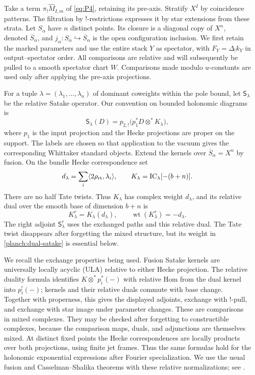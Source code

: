 \documentclass[11pt]{article}
\numberwithin{equation}{section}
\theoremstyle{definition}
\theoremstyle{remark}
\begin{document}
Take a term $\pi_!\widehat M_{I,m}$ of \eqref{eq:P4}, retaining its
pre-axis.  Stratify $X^I$ by coincidence patterns.  The filtration by
$!$-restrictions expresses it by star extensions from these strata.
Let $S_\alpha$ have $n$ distinct points.  Its closure is a diagonal copy
of $X^n$, denoted $\overline S_\alpha$, and
$j_\alpha:S_\alpha\hookrightarrow\overline S_\alpha$ is the open
configuration inclusion.  We first retain the marked parameters and
use the entire stack $Y$ as spectator, with
$F_Y=\Delta_!k_Y$ in output--spectator order.  All comparisons are
relative and will subsequently
be pulled to a smooth spectator chart $W$.  Comparisons made modulo
$u$-constants are used only after applying the pre-axis projections.

For a tuple $\lambda=(\lambda_1,\ldots,\lambda_n)$ of dominant
coweights within the pole bound, let $\mathsf S_\lambda$ be the relative
Satake operator.  Our convention on bounded holonomic diagrams is
\[
 \mathsf S_\lambda(D)
   =p_{2,!}\bigl(p_1^*D\otimes^* K_\lambda\bigr),
\]
where $p_1$ is the input projection and the Hecke projections are proper
on the support.  The labels are chosen so that application to the
vacuum gives the corresponding Whittaker standard objects.  Extend
the kernels over $\overline S_\alpha=X^n$ by fusion.  On the bundle
Hecke correspondence set
\[
 d_\lambda=\sum_i\langle2\rho_{\rm rt},\lambda_i\rangle,
 \qquad
 K_\lambda=\operatorname{IC}_\lambda[-(b+n)].
\]
There are no half Tate twists.  Thus $K_\lambda$ has complex weight
$d_\lambda$, and its relative dual over the smooth base of dimension
$b+n$ is
\begin{equation}
 K_\lambda^r=K_\lambda(d_\lambda),\qquad
 \operatorname{wt}(K_\lambda^r)=-d_\lambda.
 \label{planch:dual-satake}
\end{equation}
The right adjoint $\mathsf S_\lambda^r$ uses the exchanged paths and
this relative dual.  The Tate twist disappears after forgetting the
mixed structure, but its weight in \eqref{planch:dual-satake} is
essential below.

We recall the exchange properties being used.  Fusion Satake kernels
are universally locally acyclic (ULA) relative to either Hecke
projection.  The relative duality formula identifies
$K\otimes^*p_i^*(-)$ with relative Hom from the dual kernel into
$p_i^!(-)$; kernels and their relative duals commute with base change.
Together with properness, this gives the displayed adjoints, exchange
with $!$-pull, and exchange with star image under parameter changes.
These are comparisons in mixed complexes.  They may be checked after
forgetting to constructible complexes, because the comparison maps,
duals, and adjunctions are themselves mixed.  At distinct fixed points
the Hecke correspondences are locally products over both projections,
using finite jet frames.  Thus the same formulas hold for the
holonomic exponential expressions after Fourier specialization.
We use the usual fusion and Casselman--Shalika theorems with these
relative normalizations; see \cite{BravermanGaitsgory,GLCII}.
\end{document}
